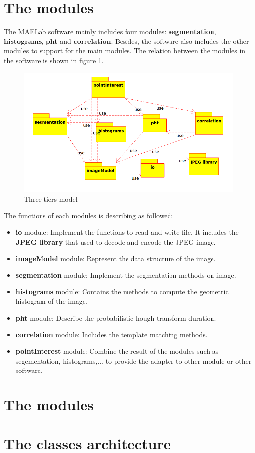 \section{The modules}
The MAELab software mainly includes four modules: \textbf{segmentation}, \textbf{histograms}, \textbf{pht} and \textbf{correlation}. Besides, the software also includes the other modules to support for the main modules. The relation between the modules in the software is shown in figure \ref{fignsmodules}.
\begin{figure}[h]
	\centering
	\includegraphics[scale=0.5]{images/modules}
	\caption{Three-tiers model}
	\label{fignsmodules}
\end{figure}
The functions of each modules is describing as followed:
\begin{itemize}
	\item \textbf{io} module: Implement the functions to read and write file. It includes the \textbf{JPEG library} that used to decode and encode the JPEG image.
	\item \textbf{imageModel} module: Represent the data structure of the image.
	\item \textbf{segmentation} module: Implement the segmentation methods on image.
	\item \textbf{histograms} module: Contains the methods to compute the geometric histogram of the image.
	\item \textbf{pht} module: Describe the probabilistic hough transform duration.
	\item \textbf{correlation} module: Includes the template matching methods.
	\item \textbf{pointInterest} module: Combine the result of the modules such as segementation, histograms,... to provide the adapter to other module or other software.
\end{itemize}
\section{The modules}
\section{The classes architecture}